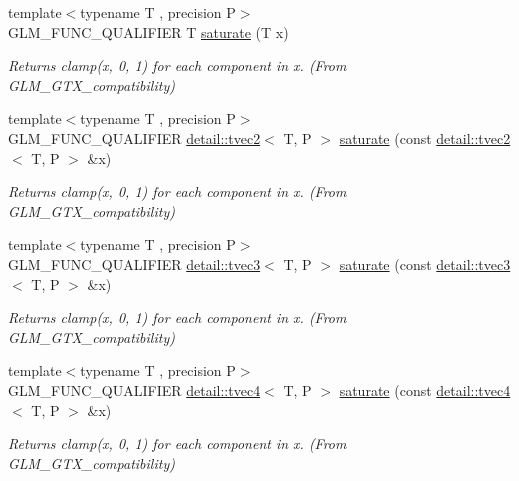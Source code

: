 \begin{DoxyCompactItemize}
{\footnotesize template$<$typename T , precision P$>$ }\\G\+L\+M\+\_\+\+F\+U\+N\+C\+\_\+\+Q\+U\+A\+L\+I\+F\+I\+ER T \hyperlink{group__gtx__compatibility_ga0fd09e616d122bc2ed9726682ffd44b7}{saturate} (T x)
\begin{DoxyCompactList}\small\item\em Returns clamp(x, 0, 1) for each component in x. (From G\+L\+M\+\_\+\+G\+T\+X\+\_\+compatibility) \end{DoxyCompactList}\item 
{\footnotesize template$<$typename T , precision P$>$ }\\G\+L\+M\+\_\+\+F\+U\+N\+C\+\_\+\+Q\+U\+A\+L\+I\+F\+I\+ER \hyperlink{structglm_1_1detail_1_1tvec2}{detail\+::tvec2}$<$ T, P $>$ \hyperlink{group__gtx__compatibility_gab7c26da683d068e34feaa3ae90a528c1}{saturate} (const \hyperlink{structglm_1_1detail_1_1tvec2}{detail\+::tvec2}$<$ T, P $>$ \&x)
\begin{DoxyCompactList}\small\item\em Returns clamp(x, 0, 1) for each component in x. (From G\+L\+M\+\_\+\+G\+T\+X\+\_\+compatibility) \end{DoxyCompactList}\item 
{\footnotesize template$<$typename T , precision P$>$ }\\G\+L\+M\+\_\+\+F\+U\+N\+C\+\_\+\+Q\+U\+A\+L\+I\+F\+I\+ER \hyperlink{structglm_1_1detail_1_1tvec3}{detail\+::tvec3}$<$ T, P $>$ \hyperlink{group__gtx__compatibility_ga367b1adb1d748e156db972cc92b42483}{saturate} (const \hyperlink{structglm_1_1detail_1_1tvec3}{detail\+::tvec3}$<$ T, P $>$ \&x)
\begin{DoxyCompactList}\small\item\em Returns clamp(x, 0, 1) for each component in x. (From G\+L\+M\+\_\+\+G\+T\+X\+\_\+compatibility) \end{DoxyCompactList}\item 
{\footnotesize template$<$typename T , precision P$>$ }\\G\+L\+M\+\_\+\+F\+U\+N\+C\+\_\+\+Q\+U\+A\+L\+I\+F\+I\+ER \hyperlink{structglm_1_1detail_1_1tvec4}{detail\+::tvec4}$<$ T, P $>$ \hyperlink{group__gtx__compatibility_gaad58ab5081f38e91ba5a99a25ba6270c}{saturate} (const \hyperlink{structglm_1_1detail_1_1tvec4}{detail\+::tvec4}$<$ T, P $>$ \&x)
\begin{DoxyCompactList}\small\item\em Returns clamp(x, 0, 1) for each component in x. (From G\+L\+M\+\_\+\+G\+T\+X\+\_\+compatibility) \end{DoxyCompactList}\item 

\end{DoxyCompactItemize}

